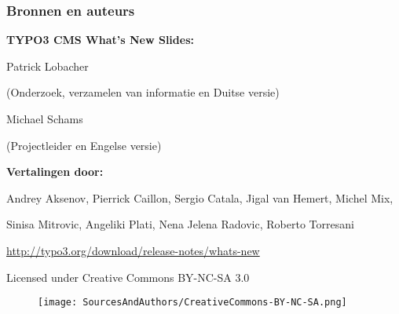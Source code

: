\begin{frame}[fragile]
	\frametitle{Bronnen en auteurs}

	\vspace{-0.6cm}

	\centerline{\textbf{TYPO3 CMS What's New Slides:}}

	\begin{center}
		\smaller
			\centerline{Patrick Lobacher}
			\centerline{(Onderzoek, verzamelen van informatie en Duitse versie)}
			\vspace{0.1cm}
			\centerline{Michael Schams}
			\centerline{(Projectleider en Engelse versie)}
		\normalsize
	\end{center}
	\vspace{-0.6cm}
	\begin{center}
		\smaller
			\centerline{\textbf{Vertalingen door:}}
			\centerline{Andrey Aksenov, Pierrick Caillon, Sergio Catala, Jigal van Hemert, Michel Mix,}
			\centerline{Sinisa Mitrovic, Angeliki Plati, Nena Jelena Radovic, Roberto Torresani}
		\normalsize
	\end{center}
	\vspace{-0.6cm}
	\smaller\begin{center}\url{http://typo3.org/download/release-notes/whats-new}\end{center}\normalsize

	\smaller\begin{center}Licensed under Creative Commons BY-NC-SA 3.0\end{center}\normalsize
	\begin{figure}\vspace*{-0.3cm}
		\texttt{[image: SourcesAndAuthors/CreativeCommons-BY-NC-SA.png]}
	\end{figure}

\end{frame}

